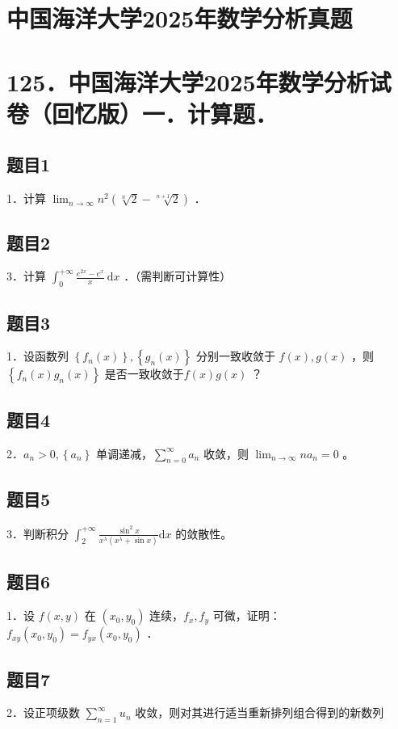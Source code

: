 \documentclass{article}
\begin{document}
\section*{中国海洋大学2025年数学分析真题}
\section*{125．中国海洋大学2025年数学分析试卷（回忆版）一．计算题．}

\subsection{题目1}
1．计算 \(\lim _{n \rightarrow \infty} n^{2}(\sqrt[n]{2}-\sqrt[n+1]{2})\) ．

\subsection{题目2}
3．计算 \(\int_{0}^{+\infty} \frac{e^{2 x}-e^{x}}{x} \mathrm{~d} x\) ．（需判断可计算性）

\subsection{题目3}
1．设函数列 \(\left\{f_{n}(x)\right\},\left\{g_{n}(x)\right\}\) 分别一致收敛于 \(f(x), g(x)\) ，则 \(\left\{f_{n}(x) g_{n}(x)\right\}\) 是否一致收敛于\(f(x) g(x)\) ？

\subsection{题目4}
2．\(a_{n}>0,\left\{a_{n}\right\}\) 单调递减，\(\sum_{n=0}^{\infty} a_{n}\) 收敛，则 \(\lim _{n \rightarrow \infty} n a_{n}=0\) 。

\subsection{题目5}
3．判断积分 \(\int_{2}^{+\infty} \frac{\sin ^{2} x}{x^{\lambda}\left(x^{\lambda}+\sin x\right)} \mathrm{d} x\) 的敛散性。

\subsection{题目6}
1．设 \(f(x, y)\) 在 \(\left(x_{0}, y_{0}\right)\) 连续，\(f_{x}, f_{y}\) 可微，证明：\(f_{x y}\left(x_{0}, y_{0}\right)=f_{y x}\left(x_{0}, y_{0}\right)\) ．

\subsection{题目7}
2．设正项级数 \(\sum_{n=1}^{\infty} u_{n}\) 收敛，则对其进行适当重新排列组合得到的新数列
\end{document}
